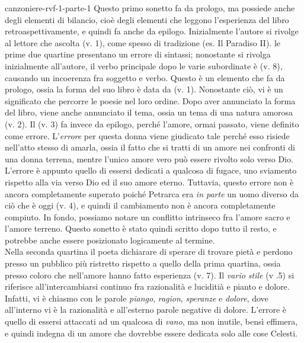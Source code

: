 \documentclass[preview]{standalone}
\begin{document}
\begin{snippet}{canzoniere-rvf-1-parte-1}
    Questo primo sonetto fa da prologo, ma possiede anche degli elementi di bilancio,
    cioè degli elementi che leggono l'esperienza del libro retroaspettivamente,
    e quindi fa anche da epilogo.
    Inizialmente l'autore si rivolge al lettore che ascolta (v. 1), come spesso di tradizione (es. Il Paradiso II).
    le prime due quartine presentano un errore di sintassi; nonostante si rivolga inizialmente all'autore,
    il verbo principale dopo le varie subordinate è  (v. 8), causando un incoerenza fra soggetto e verbo.
    Questo è un elemento che fa da prologo, ossia la forma del suo libro è data da  (v. 1).
    Nonostante ciò, vi è un significato che percorre le poesie nel loro ordine.
    Dopo aver annunciato la forma del libro, viene anche annunciato il tema, ossia
    un tema di una natura amorosa (v. 2).
    Il (v. 3) fa invece da epilogo, perché l'amore, ormai passato, viene definito come errore.
    L'\textit{errore} per questa donna viene giudicato tale perché esso risiede nell'atto stesso di amarla,
    ossia il fatto che si tratti di un amore nei confronti di una donna terrena, mentre l'unico amore
    vero può essere rivolto solo verso Dio. L'errore è appunto quello di essersi dedicati a qualcosa di fugace,
    uno sviamento rispetto alla via verso Dio ed il suo amore eterno.
    Tuttavia, questo errore non è ancora completamente superato poiché Petrarca
    era \textit{in parte} un uomo diverso da ciò che è oggi (v. 4), e quindi il cambiamento non è ancora
    completamente compiuto.
    In fondo, possiamo notare un conflitto intrinseco fra l'amore sacro e l'amore terreno.
    Questo sonetto è stato quindi scritto dopo tutto il resto, e potrebbe anche essere posizionato
    logicamente al termine.
    \\
    Nella seconda quartina il poeta dichiarare di sperare di trovare pietà e perdono
    presso un pubblico più ristretto rispetto a quello della prima quartina,
    ossia presso coloro che nell'amore hanno fatto esperienza (v. 7).
    Il \textit{vario stile} (v .5) si riferisce all'intercambiarsi continuo fra
    razionalità e luciditià e pianto e dolore. Infatti, vi è chiasmo con le parole \textit{piango},
    \textit{ragion}, \textit{speranze} e \textit{dolore}, dove all'interno vi è la razionalità e all'esterno
    parole negative di dolore.
    L'errore è quello di essersi attaccati ad un qualcosa di \textit{vano}, ma non inutile, bensì effimera, e quindi
    indegna di un amore che dovrebbe essere dedicata solo alle cose Celesti.
\end{snippet}

\end{document}
